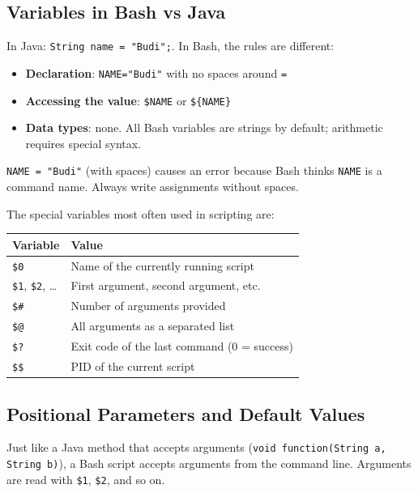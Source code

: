 \subsection*{Variables in Bash vs Java}

In Java: \texttt{String name = "Budi";}. In Bash, the rules are different:

\begin{itemize}
  \item \textbf{Declaration}: \texttt{NAME="Budi"} with no spaces around
    \texttt{=}
  \item \textbf{Accessing the value}: \texttt{\$NAME} or
    \texttt{\$\{NAME\}}
  \item \textbf{Data types}: none. All Bash variables are strings by
    default; arithmetic requires special syntax.
\end{itemize}

\begin{warningbox}
\texttt{NAME = "Budi"} (with spaces) causes an error because Bash thinks
\texttt{NAME} is a command name. Always write assignments without spaces.
\end{warningbox}

The special variables most often used in scripting are:

\begin{center}
\begin{tabular}{ll}
\hline
\textbf{Variable} & \textbf{Value} \\
\hline
\texttt{\$0} & Name of the currently running script \\
\texttt{\$1}, \texttt{\$2}, \ldots & First argument, second argument, etc. \\
\texttt{\$\#} & Number of arguments provided \\
\texttt{\$@} & All arguments as a separated list \\
\texttt{\$?} & Exit code of the last command (0 = success) \\
\texttt{\$\$} & PID of the current script \\
\hline
\end{tabular}
\end{center}

\subsection*{Positional Parameters and Default Values}

Just like a Java method that accepts arguments
(\texttt{void function(String a, String b)}), a Bash script accepts arguments
from the command line. Arguments are read with \texttt{\$1}, \texttt{\$2},
and so on.


